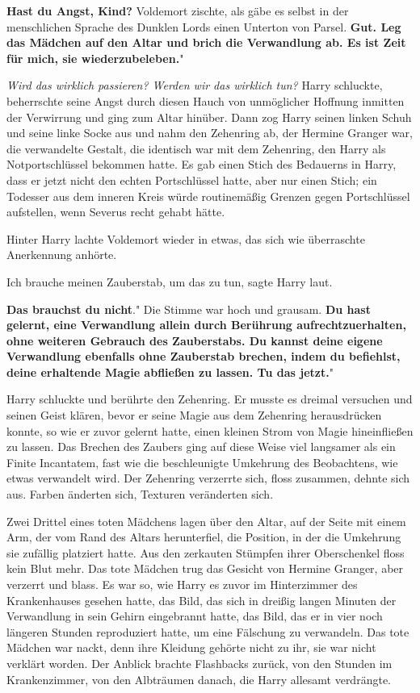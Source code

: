 \glqq \textbf{Hast du Angst, Kind?}\grqq{} Voldemort zischte, als gäbe es selbst
in der menschlichen Sprache des Dunklen Lords einen Unterton von Parsel. \glqq
\textbf{Gut. Leg das Mädchen auf den Altar und brich die Verwandlung ab. Es ist
Zeit für mich, sie wiederzubeleben.}"

\emph{Wird das wirklich passieren? Werden wir das wirklich tun? }
Harry schluckte, beherrschte seine Angst durch diesen Hauch von unmöglicher
Hoffnung inmitten der Verwirrung und ging zum Altar hinüber. Dann zog Harry
seinen linken Schuh und seine linke Socke aus und nahm den Zehenring ab, der
Hermine Granger war, die verwandelte Gestalt, die identisch war mit dem
Zehenring, den Harry als Notportschlüssel bekommen hatte. Es gab einen Stich des
Bedauerns in Harry, dass er jetzt nicht den echten Portschlüssel hatte, aber nur
einen Stich; ein Todesser aus dem inneren Kreis würde routinemäßig Grenzen gegen
Portschlüssel aufstellen, wenn Severus recht gehabt hätte.

Hinter Harry lachte Voldemort wieder in etwas, das sich wie überraschte
Anerkennung anhörte.

\glqq Ich brauche meinen Zauberstab, um das zu tun\grqq{}, sagte Harry laut.

\glqq \textbf{Das brauchst du nicht}." Die Stimme war hoch und grausam. \glqq
\textbf{Du hast gelernt, eine Verwandlung allein durch Berührung
aufrechtzuerhalten, ohne weiteren Gebrauch des Zauberstabs. Du kannst deine
eigene Verwandlung ebenfalls ohne Zauberstab brechen, indem du befiehlst, deine
erhaltende Magie abfließen zu lassen. Tu das jetzt.}"

Harry schluckte und berührte den Zehenring. Er musste es dreimal versuchen und
seinen Geist klären, bevor er seine Magie aus dem Zehenring herausdrücken
konnte, so wie er zuvor gelernt hatte, einen kleinen Strom von Magie
hineinfließen zu lassen. Das Brechen des Zaubers ging auf diese Weise viel
langsamer als ein Finite Incantatem, fast wie die beschleunigte Umkehrung des
Beobachtens, wie etwas verwandelt wird. Der Zehenring verzerrte sich, floss
zusammen, dehnte sich aus. Farben änderten sich, Texturen veränderten sich.

Zwei Drittel eines toten Mädchens lagen über den Altar, auf der Seite mit einem
Arm, der vom Rand des Altars herunterfiel, die Position, in der die Umkehrung
sie zufällig platziert hatte. Aus den zerkauten Stümpfen ihrer Oberschenkel
floss kein Blut mehr. Das tote Mädchen trug das Gesicht von Hermine Granger,
aber verzerrt und blass. Es war so, wie Harry es zuvor im Hinterzimmer des
Krankenhauses gesehen hatte, das Bild, das sich in dreißig langen Minuten der
Verwandlung in sein Gehirn eingebrannt hatte, das Bild, das er in vier noch
längeren Stunden reproduziert hatte, um eine Fälschung zu verwandeln. Das tote
Mädchen war nackt, denn ihre Kleidung gehörte nicht zu ihr, sie war nicht
verklärt worden. Der Anblick brachte Flashbacks zurück, von den Stunden im
Krankenzimmer, von den Albträumen danach, die Harry allesamt verdrängte.

